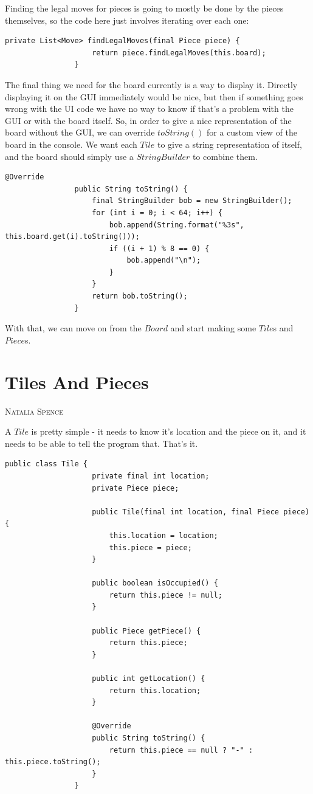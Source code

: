 \documentclass[a4paper]{report}
\makeatletter
\newcommand{\sectionauthor}[1]{%
	{\parindent0pt\vspace*{0pt}%
		\linespread{1.1}\large\scshape#1%
		\par\nobreak\vspace*{10pt}}
	\@afterheading%
}
\makeatother
\begin{document}
			\pagebreak
			
			Finding the legal moves for pieces is going to mostly be done by the pieces themselves, so the code here just involves iterating over each one:
			
			\begin{lstlisting}[frame=top, caption=Board.java]
				private List<Move> findLegalMoves(final Piece piece) {
					return piece.findLegalMoves(this.board);
				}
			\end{lstlisting} \bigskip
			
			The final thing we need for the board currently is a way to display it. Directly displaying it on the GUI immediately would be nice, but then if something goes wrong with the UI code we have no way to know if that's a problem with the GUI or with the board itself. So, in order to give a nice representation of the board without the GUI, we can override $toString()$ for a custom view of the board in the console. We want each $Tile$ to give a string representation of itself, and the board should simply use a $StringBuilder$ to combine them.
			
			\begin{lstlisting}[frame=top, caption=Board.java]
				@Override
				public String toString() {
					final StringBuilder bob = new StringBuilder();
					for (int i = 0; i < 64; i++) {
						bob.append(String.format("%3s", this.board.get(i).toString()));
						if ((i + 1) % 8 == 0) {
							bob.append("\n");
						}
					}
					return bob.toString();
				}
			\end{lstlisting} \bigskip
			
			With that, we can move on from the $Board$ and start making some $Tile$s and $Piece$s.
			
		\section{Tiles And Pieces}\label{sec:tiles and pieces}
		\sectionauthor{Natalia Spence}
		
			A $Tile$ is pretty simple - it needs to know it's location and the piece on it, and it needs to be able to tell the program that. That's it.
			
			\begin{lstlisting}[frame=top, caption=Tile.java]
				public class Tile {
					private final int location;
					private Piece piece;
					
					public Tile(final int location, final Piece piece) {
						this.location = location;
						this.piece = piece;
					}
					
					public boolean isOccupied() {
						return this.piece != null;
					}
					
					public Piece getPiece() {
						return this.piece;
					}
					
					public int getLocation() {
						return this.location;
					}
					
					@Override
					public String toString() {
						return this.piece == null ? "-" : this.piece.toString();
					}
				}
			\end{lstlisting} \bigskip
			
\end{document}
